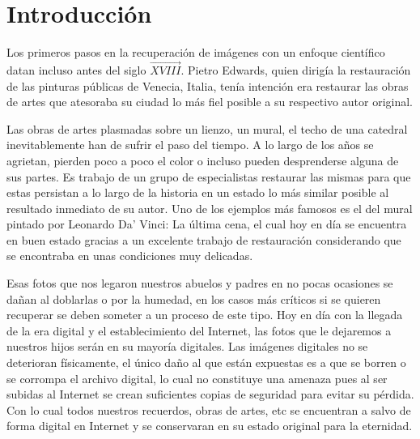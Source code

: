 \chapter*{Introducción}\label{chapter:introduction}

\qquad

Los primeros pasos en la recuperaci\'on de imágenes con un enfoque científico datan incluso antes del siglo $\vec{XVIII}$. Pietro Edwards, quien dirigía la restauraci\'on de las pinturas p\'ublicas de Venecia, Italia, ten\'ia intenci\'on era restaurar las obras de artes que atesoraba su ciudad lo m\'as fiel posible a su respectivo autor original.

Las obras de artes plasmadas sobre un lienzo, un mural, el techo de una catedral inevitablemente han de sufrir el paso del tiempo. A lo largo de los años se agrietan, pierden poco a poco el color o incluso pueden desprenderse alguna de sus partes. Es trabajo de un grupo de especialistas restaurar las mismas para que estas persistan a lo largo de la historia en un estado lo m\'as similar posible al resultado inmediato de su autor. Uno de los ejemplos m\'as famosos es el del mural pintado por Leonardo Da' Vinci: La \'ultima cena, el cual hoy en d\'ia se encuentra en buen estado gracias a un excelente trabajo de restauraci\'on considerando que se encontraba en unas condiciones muy delicadas.

Esas fotos que nos legaron nuestros abuelos y padres en no pocas ocasiones se dañan al doblarlas o por la humedad, en los casos m\'as cr\'iticos si se quieren recuperar se deben someter a un proceso de este tipo. Hoy en d\'ia con la llegada de la era digital y el establecimiento del Internet, las fotos que le dejaremos a nuestros hijos ser\'an en su mayor\'ia digitales. Las im\'agenes digitales no se deterioran físicamente, el \'unico daño al que est\'an expuestas es a que se borren o se corrompa el archivo digital, lo cual no constituye una amenaza pues al ser subidas al Internet se crean suficientes copias de seguridad para evitar su p\'erdida. Con lo cual todos nuestros recuerdos, obras de artes, etc se encuentran a salvo de forma digital en Internet y se conservaran en su estado original para la eternidad.

